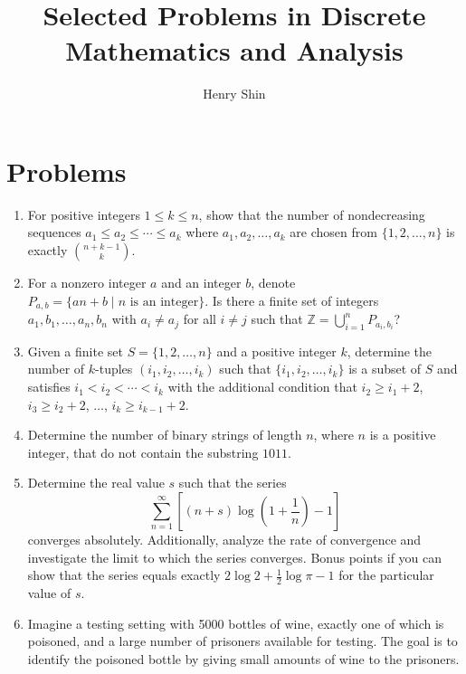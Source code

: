 \documentclass[12pt]{article}
\title{Selected Problems in Discrete Mathematics and Analysis}
\author{Henry Shin}
\date{}
\begin{document}
\maketitle

\section*{Problems}

\begin{enumerate}

    \item For positive integers \(1 \leq k \leq n\), show that the number of nondecreasing sequences \(a_1 \leq a_2 \leq \cdots \leq a_k\) where \(a_1, a_2, \ldots, a_k\) are chosen from \(\{1, 2, \ldots, n\}\) is exactly \(\binom{n+k-1}{k}\).

    \item For a nonzero integer \(a\) and an integer \(b\), denote \(P_{a,b} = \{ an + b \mid n \text{ is an integer} \}\). Is there a finite set of integers \(a_1, b_1, \ldots, a_n, b_n\) with \( a_i \neq a_j\) for all \( i \neq j \) such that \(\mathbb{Z} = \bigcup_{i=1}^{n} P_{a_i, b_i}\)?

    \item Given a finite set \( S = \{1, 2, \ldots, n\} \) and a positive integer \( k \), determine the number of \( k \)-tuples \( (i_1, i_2, \ldots, i_k) \) such that \( \{i_1, i_2, \ldots, i_k\} \) is a subset of \( S \) and satisfies \( i_1 < i_2 < \cdots < i_k \) with the additional condition that \( i_2 \geq i_1 + 2 \), \( i_3 \geq i_2 + 2 \), \(\ldots\), \( i_k \geq i_{k-1} + 2 \).

    \item Determine the number of binary strings of length \( n \), where \( n \) is a positive integer, that do not contain the substring \( 1011 \).

    \item Determine the real value \( s \) such that the series
\[
\sum_{n=1}^{\infty} \left[(n+s)\log\left(1 + \frac{1}{n}\right) - 1\right]
\]
converges absolutely. Additionally, analyze the rate of convergence and investigate the limit to which the series converges. Bonus points if you can show that the series equals exactly \( 2 \log 2 + \frac{1}{2} \log \pi - 1 \) for the particular value of \( s\).

    \item Imagine a testing setting with 5000 bottles of wine, exactly one of which is poisoned, and a large number of prisoners available for testing. The goal is to identify the poisoned bottle by giving small amounts of wine to the prisoners.


\end{enumerate}
\end{document}
